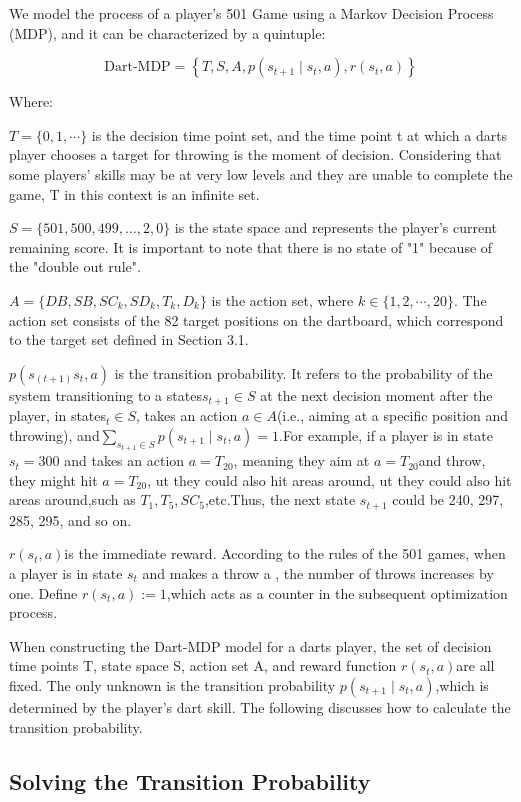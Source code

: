 \documentclass[cjjs]{ipart}
\theoremstyle{plain}
\begin{document}
We model the process of a player's 501 Game using a Markov Decision Process (MDP), and it can be characterized by a quintuple:

\[
\text{Dart-MDP} = \left\{ T, S, A, p(s_{t+1} \mid s_t, a), r(s_t, a) \right\}
\]

Where:  

$T= \{ 0, 1, \cdots\}$ is the decision time point set, and the time point t at which a darts player chooses a target for throwing is the moment of decision. Considering that some players’ skills may be at very low levels and they are unable to complete the game, T in this context is an infinite set.

$S = \{501, 500, 499, \dots, 2, 0\}$ is the state space and represents the player's current remaining score. It is important to note that there is no state of "1" because of the "double out rule".

$A = \{ DB, SB, SC_k, SD_k, T_k, D_k \}$ is the action set, where $k \in \{ 1, 2,\cdots, 20 \}$. The action set consists of the 82 target positions on the dartboard, which correspond to the target set defined in Section 3.1.

$p(s_(t+1) s_t,a)$ is the transition probability. It refers to the probability of the system transitioning to a states$s_{t+1} \in S$ at the next decision moment after the player, in states$_t \in S$, takes an action $a \in A$(i.e., aiming at a specific position and throwing), and$\sum_{s_{t+1} \in S} p(s_{t+1} \mid s_t, a) = 1$.For example, if a player is in state $s_t = 300$ and takes an action $a = T_{20}$, meaning they aim at $a = T_{20}$and throw, they might hit $a = T_{20}$, ut they could also hit areas around, ut they could also hit areas around,such as $T_1, T_5, SC_5$,etc.Thus, the next state $s_{t+1}$ could be 240, 297, 285, 295, and so on.

$r(s_t,a)$is the immediate reward. According to the rules of the 501 games, when a player is in state $s_t$ and makes a throw a , the number of throws increases by one. Define
$r(s_t, a) := 1$,which acts as a counter in the subsequent optimization process.

When constructing the Dart-MDP model for a darts player, the set of decision time points T, state space S, action set A, and reward function $r(s_t, a)$are all fixed. The only unknown is the transition probability $p(s_{t+1} \mid s_t, a)$,which is determined by the player's dart skill. The following discusses how to calculate the transition probability.

\subsection{Solving the Transition Probability}
\end{document}
